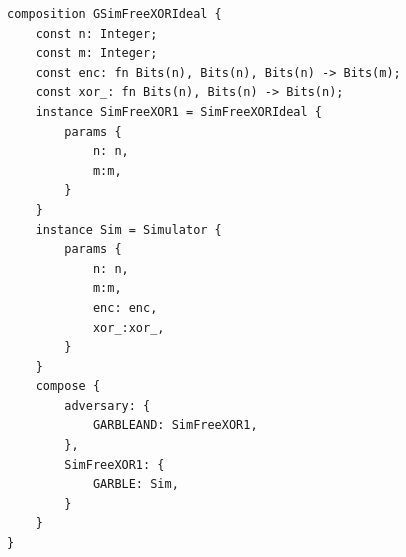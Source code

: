 \begin{longlisting}
\begin{verbatim}
composition GSimFreeXORIdeal {
    const n: Integer; 
    const m: Integer; 
    const enc: fn Bits(n), Bits(n), Bits(n) -> Bits(m); 
    const xor_: fn Bits(n), Bits(n) -> Bits(n);
    instance SimFreeXOR1 = SimFreeXORIdeal {
        params {
            n: n,
            m:m,
        }
    }
    instance Sim = Simulator {
        params {
            n: n,
            m:m,
            enc: enc,
            xor_:xor_,
        }
    }
    compose {
        adversary: {
            GARBLEAND: SimFreeXOR1,
        },
        SimFreeXOR1: {
            GARBLE: Sim,
        }
    }
}
\end{verbatim}
\caption{Composition }
\label{lst:domino-composition-simfreexorideal}
\end{longlisting}